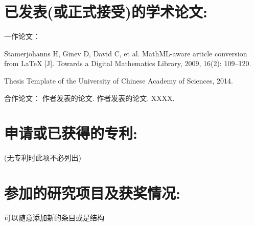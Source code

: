 \section*{已发表(或正式接受)的学术论文:}

\noindent
一作论文：
\setcounter{mycnt}{0}

\noindent
\stepaddpaper \hangindent=0.7cm Stamerjohanns H, Ginev D, David C, et al. MathML-aware article conversion from LaTeX [J]. Towards a Digital Mathematics Library, 2009, 16(2): 109–120.

\noindent
\stepaddpaper \hangindent=0.7cm Thesis Template of the University of Chinese Academy of Sciences, 2014.


\noindent
合作论文：
\setcounter{mycnt}{0}
\newline\noindent
\stepaddpaper 作者发表的论文.
\newline\noindent
\stepaddpaper 作者发表的论文.
\newline\noindent
\stepaddpaper XXXX.


\section*{申请或已获得的专利:}

(无专利时此项不必列出)

\section*{参加的研究项目及获奖情况:}

可以随意添加新的条目或是结构



